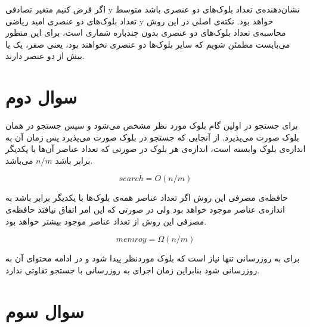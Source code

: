 \documentclass[paper=a4, fontsize=11pt]{article}
\numberwithin{equation}{section} %
\numberwithin{figure}{section} %
\numberwithin{table}{section} %
\begin{document}
\par
اگر فرض کنیم متغیر تصادفی y نشان‌دهنده‌ی تعداد بلوک‌های دو عنصری باشد
متوسط تعداد بلوک‌های دو عنصری امید ریاضی y خواهد بود.
نکته‌ی اصلی در این روش محاسبه‌ی تعداد بلوک‌های دو عنصری بدون چندباره شماری است،
برای این منظور می‌بایست مطمئن شویم که سایر بلوک‌ها دو عنصری نخواهند بود، یعنی
صفر، یک یا بیش از دو عنصر دارند.

\section{سوال دوم}
\par
برای جستجو در اولین گام بلوک مورد نظر مشخص می‌شود و سپس جستجو در همان بلوک صورت می‌پذیرد.
از آنجایی که جستجو در بلوک صورت می‌پذیرد پس زمان آن به اندازه‌ی بلوک وابسته است،
اندازه‌ی هر بلوک در صورتی که تعداد عناصر آن‌ها با یکدیگر برابر باشد
$n/m$
می‌باشد.

$$
search = O(n/m)
$$

\par
حافظه‌ی مصرفی این روش اگر تعداد عناصر همه‌ی بلوک‌ها با یکدیگر برابر باشد
به اندازه‌ی عناصر موجود خواهد بود ولی
در صورتی که این امر اتفاق نیافتد
حافظه‌ی مصرفی این روش از تعداد عناصر موجود بیشتر خواهد بود.

$$
memroy = \Omega(n/m)
$$

\par
برای به روزرسانی تنها نیاز است که بلوک موردنظر پیدا شود
و در ادامه محتوای آن به روزرسانی شود
بنابراین زمان اجرای به روزرسانی با جستجو تفاوتی ندارد.

\section{سوال سوم}
\end{document}
